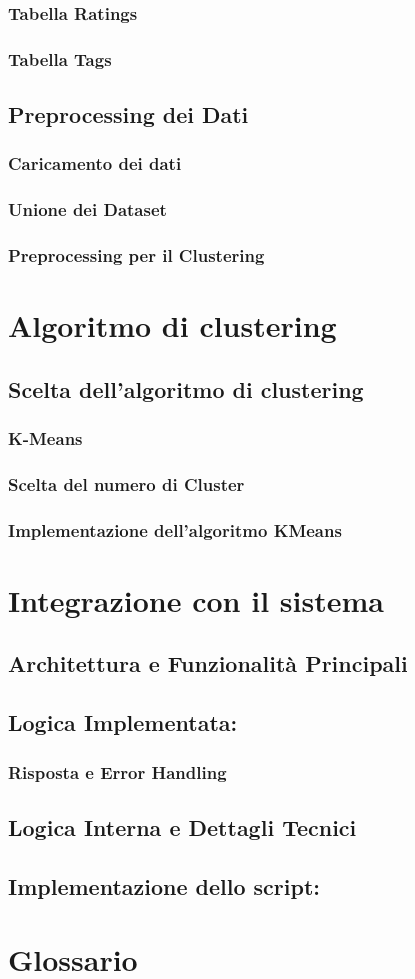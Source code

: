 \documentclass[a4paper,12pt]{article}
\begin{document}
\subsubsection{Tabella Ratings}
\subsubsection{Tabella Tags}
\subsection{Preprocessing dei Dati}
\subsubsection{Caricamento dei dati}
\subsubsection{Unione dei Dataset}
\subsubsection{Preprocessing per il Clustering}
\section{Algoritmo di clustering}
\subsection{Scelta dell’algoritmo di clustering}
\subsubsection{K-Means}
\subsubsection{Scelta del numero di Cluster}
\subsubsection{Implementazione dell'algoritmo KMeans}
\section{Integrazione con il sistema}
\subsection{Architettura e Funzionalità Principali}
\subsection{Logica Implementata: }
\subsubsection{Risposta e Error Handling}
\subsection{Logica Interna e Dettagli Tecnici}
\subsection{Implementazione dello script: }
\section{Glossario}
\end{document}

